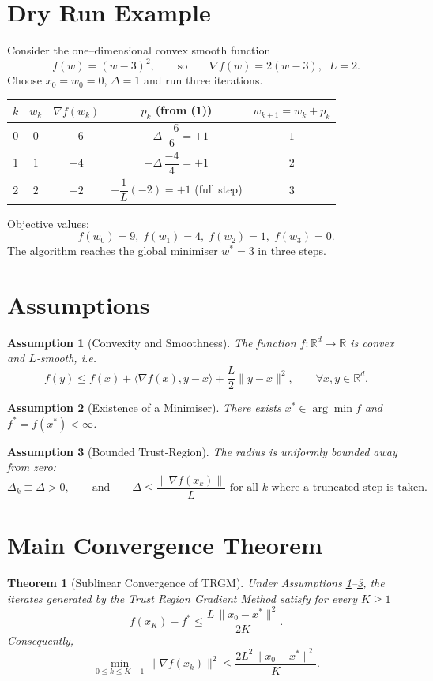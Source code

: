 \documentclass{article}
\newtheorem{theorem}{Theorem}
\newtheorem{assumption}{Assumption}
\newcommand{\R}{\mathbb{R}}
\begin{document}
\section*{Dry Run Example}
Consider the one–dimensional convex smooth function
\[
f(w)=(w-3)^{2},
\qquad\text{so}\qquad \nabla f(w)=2(w-3),\;\; L=2 .
\]
Choose $x_0=w_0=0$, $\Delta=1$ and run three iterations.

\begin{center}
\begin{tabular}{c|c|c|c|c}
$k$ & $w_k$ & $\nabla f(w_k)$ & $p_k$ (from (1)) & $w_{k+1}=w_k+p_k$ \\ \hline
0 & $0$ & $-6$ & $-\Delta\,\dfrac{-6}{6}=+1$ & $1$ \\
1 & $1$ & $-4$ & $-\Delta\,\dfrac{-4}{4}=+1$ & $2$ \\
2 & $2$ & $-2$ & $-\dfrac{1}{L}(-2)=+1$ (full step) & $3$ 
\end{tabular}
\end{center}

Objective values:
\[
f(w_0)=9,\; f(w_1)=4,\; f(w_2)=1,\; f(w_3)=0 .
\]
The algorithm reaches the global minimiser $w^{*}=3$ in three steps.

\newpage
\section*{Assumptions}
\begin{assumption}[Convexity and Smoothness]\label{ass:convex}
The function $f:\R^{d}\rightarrow\R$ is convex and $L$‑smooth, i.e.
\[
f(y)\le f(x)+\langle\nabla f(x),y-x\rangle+\frac{L}{2}\|y-x\|^{2},
\qquad\forall x,y\in\R^{d}.
\tag{A1}
\]
\end{assumption}
\begin{assumption}[Existence of a Minimiser]\label{ass:opt}
There exists $x^{*}\in\arg\min f$ and $f^{*}=f(x^{*})<\infty$.
\end{assumption}
\begin{assumption}[Bounded Trust‑Region]\label{ass:delta}
The radius is uniformly bounded away from zero:
\[
\Delta_k\equiv\Delta>0,\qquad\text{and}\qquad \Delta\le \frac{\|\nabla f(x_k)\|}{L}
\text{ for all }k\text{ where a truncated step is taken}.
\tag{A3}
\]
\end{assumption}

\section*{Main Convergence Theorem}
\begin{theorem}[Sublinear Convergence of TRGM]\label{thm:conv}
Under Assumptions \ref{ass:convex}–\ref{ass:delta}, the iterates generated by the Trust Region Gradient Method satisfy for every $K\ge1$
\[
f(x_K)-f^{*}\le\frac{L\,\|x_0-x^{*}\|^{2}}{2K}.
\tag{3}
\]
Consequently,
\[
\min_{0\le k\le K-1}\|\nabla f(x_k)\|^{2}\le\frac{2L^{2}\|x_0-x^{*}\|^{2}}{K}.
\tag{4}
\]
\end{theorem}
\end{document}
